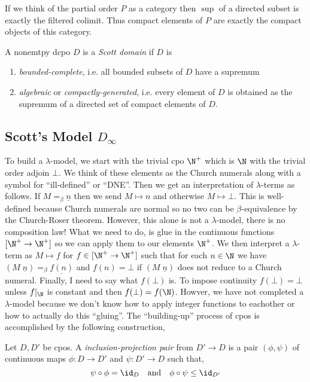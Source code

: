 \documentclass[12pt]{article}
\begin{document}
\begin{rmk}
If we think of the partial order $P$ as a category then $\sup$ of a directed subset is exactly the filtered colimit. Thus compact elements of $P$ are exactly the compact objects of this category.
\end{rmk}

\begin{defn}
A nonemtpy dcpo $D$ is a \textit{Scott domain} if $D$ is 
\begin{enumerate}
\item \textit{bounded-complete}, i.e. all bounded subsets of $D$ have a supremum
\item \textit{algebraic} or \textit{compactly-generated}, i.e. every element of $D$ is obtained as the supremum of a directed set of compact elements of $D$.
\end{enumerate}
\end{defn}

\subsection{Scott's Model $D_{\infty}$}

To build a $\lambda$-model, we start with the trivial cpo $\N^+$ which is $\N$ with the trivial order adjoin $\bot$. We think of these elements as the Church numerals along with a symbol for ``ill-defined'' or ``DNE''. Then we get an interpretation of $\lambda$-terms as follows. If $M =_\beta \underline{n}$ then we send $M \mapsto n$ and otherwise $M \mapsto \bot$. This is well-defined because Church numerals are normal so no two can be $\beta$-equivalence by the Church-Roser theorem. However, this alone is not a $\lambda$-model, there is no composition law! What we need to do, is glue in the continuous functions $[\N^+ \to \N^+]$ so we can apply them to our elements $\N^+$. We then interpret a $\lambda$-term as $M \mapsto f$ for $f \in [\N^+ \to \N^+]$ such that for each $n \in \N$ we have $(M \; \underline{n}) =_\beta \underline{f(n)}$ and $f(n) = \bot$ if $(M \; \underline{n})$ does not reduce to a Church numeral. Finally, I need to say what $f(\bot)$ is. To impose continuity $f(\bot) = \bot$ unless $f|_{\N}$ is constant and then $f(\bot) = f(\N)$. Howver, we have not completed a $\lambda$-model because we don't know how to apply integer functions to eachother or how to actually do this ``gluing''. The ``building-up'' process of cpos is accomplished by the following construction,

\begin{defn}
Let $D, D'$ be cpos. A \textit{inclusion-projection pair} from $D' \to D$ is a pair $(\phi, \psi)$ of continuous maps $\phi : D \to D'$ and $\psi : D' \to D$ such that,
\[ \psi \circ \phi = \id_D \quad \text{and} \quad \phi \circ \psi \le \id_{D'} \]
\end{defn}
\end{document}
